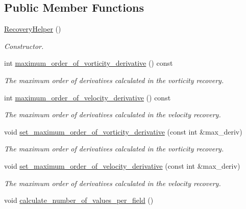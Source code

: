 \subsection*{Public Member Functions}
\begin{DoxyCompactItemize}
\item 
\hyperlink{classVorticityRecoveryHelpers_1_1RecoveryHelper_a7886feabeb1b6de8a2247a75027496e2}{Recovery\+Helper} ()
\begin{DoxyCompactList}\small\item\em Constructor. \end{DoxyCompactList}\item 
int \hyperlink{classVorticityRecoveryHelpers_1_1RecoveryHelper_adb6557286bdb253aab24ebb8b8ccf49d}{maximum\+\_\+order\+\_\+of\+\_\+vorticity\+\_\+derivative} () const
\begin{DoxyCompactList}\small\item\em The maximum order of derivatives calculated in the vorticity recovery. \end{DoxyCompactList}\item 
int \hyperlink{classVorticityRecoveryHelpers_1_1RecoveryHelper_a315b1e8dee15b91e356d9e13de992b1f}{maximum\+\_\+order\+\_\+of\+\_\+velocity\+\_\+derivative} () const
\begin{DoxyCompactList}\small\item\em The maximum order of derivatives calculated in the velocity recovery. \end{DoxyCompactList}\item 
void \hyperlink{classVorticityRecoveryHelpers_1_1RecoveryHelper_a22e65698b08e4e988c86fa00d753d321}{set\+\_\+maximum\+\_\+order\+\_\+of\+\_\+vorticity\+\_\+derivative} (const int \&max\+\_\+deriv)
\begin{DoxyCompactList}\small\item\em The maximum order of derivatives calculated in the vorticity recovery. \end{DoxyCompactList}\item 
void \hyperlink{classVorticityRecoveryHelpers_1_1RecoveryHelper_a12d852f0b0ce7a213fb0e671ea23fa6a}{set\+\_\+maximum\+\_\+order\+\_\+of\+\_\+velocity\+\_\+derivative} (const int \&max\+\_\+deriv)
\begin{DoxyCompactList}\small\item\em The maximum order of derivatives calculated in the velocity recovery. \end{DoxyCompactList}\item 
void \hyperlink{classVorticityRecoveryHelpers_1_1RecoveryHelper_ae87da483fce339751a2917e79441df36}{calculate\+\_\+number\+\_\+of\+\_\+values\+\_\+per\+\_\+field} ()

\end{DoxyCompactItemize}
